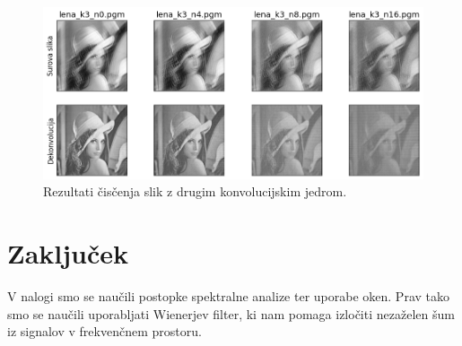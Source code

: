 \documentclass[slovene,11pt,a4paper]{article}
\begin{document}
\newpage

\begin{figure}[h!]
\centering
\includegraphics[width=12cm]{slika18.png}
\caption{Rezultati čisčenja slik z drugim konvolucijskim jedrom.}
\end{figure}

\section{Zaključek}

V nalogi smo se naučili postopke spektralne analize ter uporabe oken. Prav tako smo se naučili uporabljati Wienerjev filter, ki nam pomaga izločiti nezaželen šum iz signalov v frekvenčnem prostoru.
\end{document}
